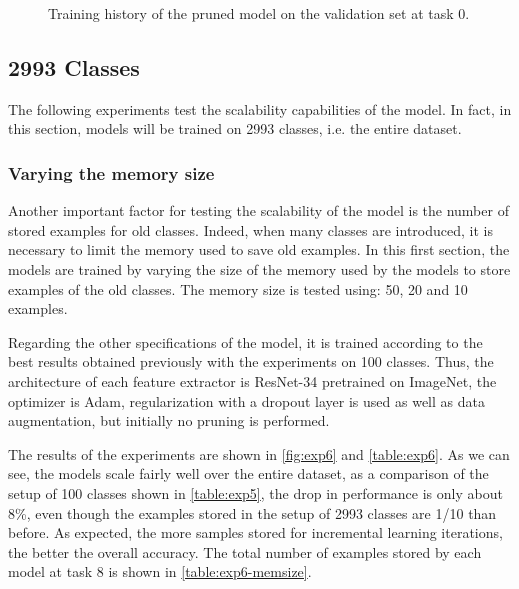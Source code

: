 \begin{figure}[H]
	\caption{Training history of the pruned model on the validation set at task 0.}%
	\label{fig:exp5-loss}%
\end{figure}


\subsection{2993 Classes}
\label{sec:whole_dataset_clf}

The following experiments test the scalability capabilities of the model. In fact, in this section, models will be trained on 2993 classes, i.e. the entire dataset.

\subsubsection{Varying the memory size}
Another important factor for testing the scalability of the model is the number of stored examples for old classes. Indeed, when many classes are introduced, it is necessary to limit the memory used to save old examples.
In this first section, the models are trained by varying the size of the memory used by the models to store examples of the old classes. The memory size is tested using: 50, 20 and 10 examples.

Regarding the other specifications of the model, it is trained according to the best results obtained previously with the experiments on 100 classes. Thus, the architecture of each feature extractor is ResNet-34 pretrained on ImageNet, the optimizer is Adam, regularization with a dropout layer is used as well as data augmentation, but initially no pruning is performed.

The results of the experiments are shown in \autoref{fig:exp6} and \autoref{table:exp6}.
As we can see, the models scale fairly well over the entire dataset, as a comparison of the setup of 100 classes shown in \autoref{table:exp5}, the drop in performance is only about 8\%, even though the examples stored in the setup of 2993 classes are 1/10 than before. As expected, the more samples stored for incremental learning iterations, the better the overall accuracy. The total number of examples stored by each model at task 8 is shown in \autoref{table:exp6-memsize}.

